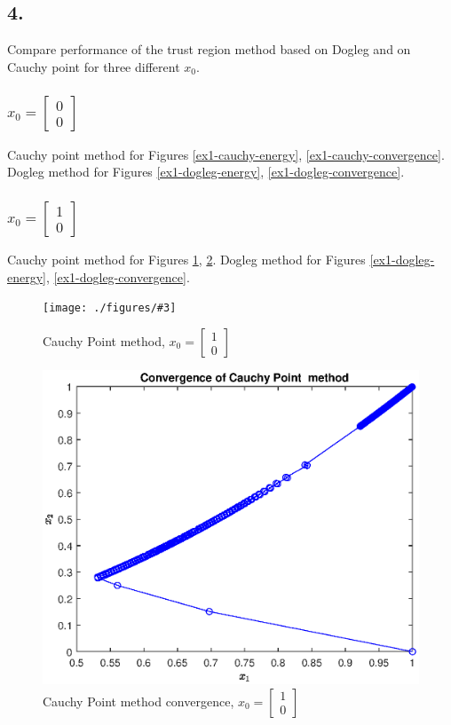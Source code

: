 \documentclass[unicode,11pt,a4paper,oneside,numbers=endperiod,openany]{scrartcl}
\newcommand{\myvec}[1]{\begin{bmatrix} #1 \end{bmatrix}}
\newcommand{\myFigureEnergy}[3]{
    \begin{figure}[htbp]
    \centering
    \caption{#1}
    \label{#2}
    \texttt{[image: ./figures/\#3]}
    \end{figure}
}
\begin{document}
\subsection*{4.}
Compare performance of the trust region method based on Dogleg and on Cauchy point for three
different $x_0$.

\subsubsection*{$x_0 = \myvec{0 \\ 0}$}
Cauchy point method for Figures \ref{ex1-cauchy-energy}, \ref{ex1-cauchy-convergence}.
Dogleg method for Figures \ref{ex1-dogleg-energy}, \ref{ex1-dogleg-convergence}.

\subsubsection*{$x_0 = \myvec{1 \\ 0}$}
Cauchy point method for Figures \ref{ex1-4-10-cauchy-energy}, \ref{ex1-4-10-cauchy-convergence}.
Dogleg method for Figures \ref{ex1-dogleg-energy}, \ref{ex1-dogleg-convergence}.

\myFigureEnergy{Cauchy Point method, $x_0 = \myvec{1 \\ 0}$}{ex1-4-10-cauchy-energy}{ex1-4-10-energy.eps}
\begin{figure}[htbp]
\centering
\caption{Cauchy Point method convergence, $x_0 = \myvec{1 \\ 0}$}
\label{ex1-4-10-cauchy-convergence}
\includegraphics[width=\textwidth, trim={0cm 0cm 0cm 0cm}]{./figures/ex1-4-10-convergence.eps}
\end{figure}
\end{document}
